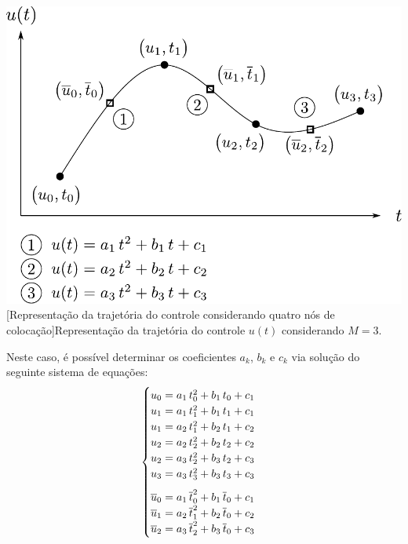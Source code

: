 \noindent	
\begin{minipage}{\textwidth}
	\vspace{\onelineskip}
	\centering
	\includegraphics[width=0.75\linewidth]{draw/revisao/pdf/controleQuadratico4pontos}
	[Representação da trajetória do controle considerando quatro nós de colocação]{Representação da trajetória do controle $ u(t) $ considerando $ M = 3 $.}
	\label{fig:revisao:controleQuadratico4pontos}
	\vspace{\onelineskip}
\end{minipage}

Neste caso, é possível determinar  os coeficientes $ a_k $, $ b_k $ e $ c_k $ via solução do seguinte sistema de equações:
%
\begin{equation}
\label{eq:revisao:splinesQuadraticas}
\begin{cases}
u_0 = a_1 \, t_0^2 + b_1 \, t_0 + c_1 \\
u_1 = a_1 \, t_1^2 + b_1 \, t_1 + c_1 \\
u_1 = a_2 \, t_1^2 + b_2 \, t_1 + c_2 \\
u_2 = a_2 \, t_2^2 + b_2 \, t_2 + c_2 \\
u_2 = a_3 \, t_2^2 + b_3 \, t_2 + c_3 \\
u_3 = a_3 \, t_3^2 + b_3 \, t_3 + c_3 \vspace{0.25cm} \\ 
\overline{u}_0 = a_1 \, \overline{t}_0^2 + b_1 \, \overline{t}_0 + c_1 \\
\overline{u}_1 = a_2 \, \overline{t}_1^2 + b_2 \, \overline{t}_0 + c_2 \\
\overline{u}_2 = a_3 \, \overline{t}_2^2 + b_3 \, \overline{t}_0 + c_3
\end{cases}
\end{equation}

